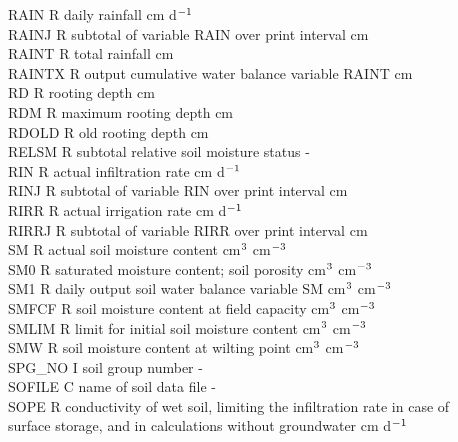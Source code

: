 \documentclass[11pt]{article}
\begin{document}
\begin{tabbing}
RAIN\> \> R\> daily rainfall\> \> \> \> \> \> \> cm d$^{{\rm -1}}$\\
RAINJ\> \> R\> subtotal of variable RAIN over print interval\> \> \> \> \> \> \> cm\\
RAINT\> \> R\> total rainfall\> \> \> \> \> \> \> cm\\
RAINTX\> \> R\> output cumulative water balance variable RAINT\> \> \> \> \> \> \> cm\\
RD\> \> R\> rooting depth\> \> \> \> \> \> \> cm\\
RDM\> \> R\> maximum rooting depth\> \> \> \> \> \> \> cm\\
RDOLD\> \> R\> old rooting depth\> \> \> \> \> \> \> cm\\
 RELSM\> \> \> R\> subtotal relative soil moisture status\> \> \> \> \> \> -\\
RIN\> \> R\> actual infiltration rate\> \> \> \> \> \> \> cm d$^{{\rm -1}}$\\
RINJ\> \> R\> subtotal of variable RIN over print interval\> \> \> \> \> \> \> cm\\
RIRR\> \> R\> actual irrigation rate\> \> \> \> \> \> \> cm d$^{{\rm -1}}$\\
RIRRJ\> \> R\> subtotal of variable RIRR over print interval\> \> \> \> \> \> \> cm\\
SM\> \> R\> actual soil moisture content\> \> \> \> \> \> \> cm$^{{\rm 3}}$ cm$^{{\rm -3}}$\\
SM0\> \> R\> saturated moisture content; soil porosity\> \> \> \> \> \> \> cm$^{{\rm 3}}$ cm$^{{\rm -3}}$\\
SM1\> \> R\> daily output soil water balance variable SM\> \> \> \> \> \> \> cm$^{{\rm 3}}$ cm$^{{\rm -3}}$\\
SMFCF\> \> R\> soil moisture content at field capacity\> \> \> \> \> \> \> cm$^{{\rm 3}}$ cm$^{{\rm -3}}$\\
SMLIM\> \> R\> limit for initial soil moisture content\> \> \> \> \> \> \> cm$^{{\rm 3}}$ cm$^{{\rm -3}}$\\
SMW\> \> R\> soil moisture content at wilting point\> \> \> \> \> \> \> cm$^{{\rm 3}}$ cm$^{{\rm -3}}$\\
SPG\_NO\> \> I\> soil group number\> \> \> \> \> \> \> -\\
SOFILE\> \> C\> name of soil data file\> \> \> \> \> \> \> -\\
SOPE\> \> R\> conductivity of wet soil, limiting the infiltration rate in case of \\
\>\> \> surface storage, and in calculations without groundwater \> \> \> \> \> \> \> cm d$^{{\rm -1}}$\\

\end{tabbing}
\end{document}
